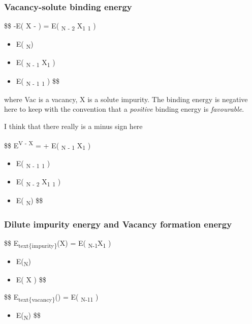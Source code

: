 \documentclass[11pt]{article}
\begin{document}
\subsubsection{Vacancy-solute binding energy}
\label{sec:org17b98ea}
\cite{wolverton07_solut_vacan_bindin_alumin}

\$\$ -E\textsubscript{}( X -  ) = E( \textsubscript{N - 2} X\textsubscript{1} \textsubscript{1} )
\begin{itemize}
\item E( \textsubscript{N})
\item E( \textsubscript{N - 1} X\textsubscript{1} )
\item E( \textsubscript{N - 1} \textsubscript{1} ) \$\$
\end{itemize}

where Vac is a vacancy, X is a solute impurity. The binding energy is negative
here to keep with the convention that a \emph{positive} binding energy is
\emph{favourable}.

I think that there really is a minus sign here


\cite{deng16_ab_initio_solut_inter_impur}

\$\$ E\textsubscript{}\textsuperscript{V - X} =   + E( \textsubscript{N - 1} X\textsubscript{1} ) 
\begin{itemize}
\item E( \textsubscript{N - 1} \textsubscript{1} )
\item E( \textsubscript{N - 2} X\textsubscript{1} \textsubscript{1} )
\item E( \textsubscript{N})                       \$\$
\end{itemize}

\subsubsection{Dilute impurity energy and Vacancy formation energy}
\label{sec:orgb00ad0b}
\cite{wolverton07_solut_vacan_bindin_alumin}
\$\$ E\textsubscript{text\{impurity\}}(X) = E( \textsubscript{N-1}X\textsubscript{1} ) 
\begin{itemize}
\item {} E(\textsubscript{N})
\item E( X ) \$\$
\end{itemize}

\$\$ E\textsubscript{text\{vacancy\}}() = E( \textsubscript{N-1}\textsubscript{1} ) 
\begin{itemize}
\item {} E(\textsubscript{N}) \$\$
\end{itemize}
\end{document}
